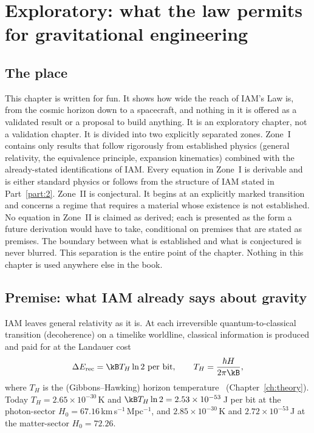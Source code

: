 \chapter{Exploratory: what the law permits for gravitational engineering}\label{ch:exploratory}

\section*{The place}
This chapter is written for fun. It shows how wide the reach of IAM's Law is, from the cosmic horizon down to a spacecraft, and
nothing in it is offered as a validated result or a proposal to build anything. It is an exploratory chapter, not a validation chapter. It is divided into two explicitly separated zones. Zone~I contains only results that follow
rigorously from established physics (general relativity, the equivalence principle, expansion kinematics) combined with the already-stated
identifications of IAM. Every equation in Zone~I is derivable and is either standard physics or follows from the structure of IAM stated in
Part~\ref{part:2}. Zone~II is conjectural. It begins at an explicitly marked transition and concerns a regime that requires a material whose existence
is not established. No equation in Zone~II is claimed as derived; each is presented as the form a future derivation would have to take, conditional on
premises that are stated as premises. The boundary between what is established and what is conjectured is never blurred. This separation is the
entire point of the chapter. Nothing in this chapter is used anywhere else in the book.

\section{Premise: what IAM already says about gravity}\label{sec:ge_premise}
IAM leaves general relativity as it is. At each irreversible quantum-to-classical transition (decoherence) on a timelike worldline, classical
information is produced and paid for at the Landauer cost~\cite{Landauer1961}
\begin{equation}
\Delta E_{\rm rec}=\kB T_H\ln2\ \text{per bit},\qquad T_H=\frac{\hbar H}{2\pi\kB},
\label{eq:ge_landauer}
\end{equation}
where $T_H$ is the (Gibbons--Hawking) horizon temperature~\cite{GibbonsHawking1977} (Chapter~\ref{ch:theory}). Today $T_H=2.65\times10^{-30}$\,K and
$\kB T_H\ln2=2.53\times10^{-53}$\,J per bit at the photon-sector $H_0=67.16$\,km\,s$^{-1}$\,Mpc$^{-1}$, and $2.85\times10^{-30}$\,K and
$2.72\times10^{-53}$\,J at the matter-sector $H_0=72.26$. \calc

